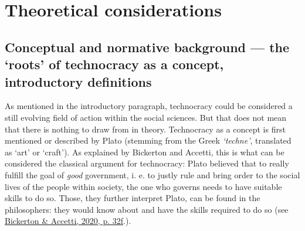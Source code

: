 \documentclass[
  12pt,
  english,
]{article}
\begin{document}
\hypertarget{theoretical-considerations}{%
\section{Theoretical considerations}\label{theoretical-considerations}}

\hypertarget{conceptual-and-normative-background-the-roots-of-technocracy-as-a-concept-introductory-definitions}{%
\subsection{Conceptual and normative background --- the `roots' of
technocracy as a concept, introductory
definitions}\label{conceptual-and-normative-background-the-roots-of-technocracy-as-a-concept-introductory-definitions}}

As mentioned in the introductory paragraph, technocracy could be
considered a still evolving field of action within the social sciences.
But that does not mean that there is nothing to draw from in theory.
Technocracy as a concept is first mentioned or described by Plato
(stemming from the Greek \emph{`techne'}, translated as `art' or
`craft'). As explained by Bickerton and Accetti, this is what can be
considered the classical argument for technocracy: Plato believed that
to really fulfill the goal of \emph{good} government, i. e. to justly
rule and bring order to the social lives of the people within society,
the one who governs needs to have suitable skills to do so. Those, they
further interpret Plato, can be found in the philosophers: they would
know about and have the skills required to do so (see
\protect\hyperlink{ref-bickerton2020technocracy}{Bickerton \& Accetti,
2020, p. 32f}.).
\end{document}

